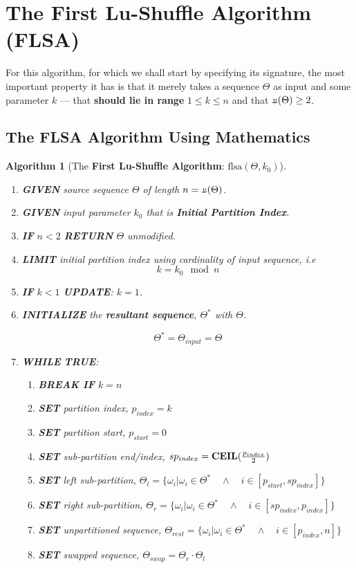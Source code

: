 \documentclass[a4paper, 18pt]{book} %
\newtheorem{alg}{Algorithm}
\newcommand{\invpi}{\rotatebox[origin=c]{180}{$\pi$}}
\begin{document}
\section{The First Lu-Shuffle Algorithm (FLSA)}

For this algorithm, for which we shall start by specifying its signature, the most important property it has is that it merely takes a sequence $\Theta$ as input and some parameter $k$ --- that \textbf{should lie in range} $1 \leq k \leq n$ and that $\invpi(\Theta) \geq 2$.

\subsection{The FLSA Algorithm Using Mathematics}

\begin{alg}[The \textbf{First Lu-Shuffle Algorithm}: $\text{flsa}(\Theta, k_0)$]
\label{ALGLUSHUFFLEA}
$ $\\
\begin{enumerate}
\item \textbf{GIVEN} source sequence $\Theta$ of length $n = \invpi(\Theta)$.
\item  \textbf{GIVEN} input parameter $k_0$ that is \textbf{Initial Partition Index}.
\item \textbf{IF} $n < 2$ \textbf{RETURN} $\Theta$ unmodified.
\item {\textbf{LIMIT} initial partition index using cardinality of input sequence, i.e
\begin{equation}
k = k_0 \mod n
\end{equation}
}
\item \textbf{IF} $k < 1$ \textbf{UPDATE}: $k = 1$.
\item{  \textbf{INITIALIZE} the \textbf{resultant sequence}, $\Theta^*$ with $\Theta$.

		\begin{equation}
		\Theta^* = \Theta_{input} = \Theta
		\end{equation}
}
\item { \textbf{WHILE} \textbf{TRUE}:
\begin{enumerate}
	\item \textbf{BREAK IF} $k = n$
	\item \textbf{SET} partition index, $p_{index} = k$
	\item \textbf{SET} partition start, $p_{start} = 0$
	\item \textbf{SET} sub-partition end/index, $sp_{index} = \text{\textbf{CEIL}}(\frac{p_{index}}{2})$
	\item \textbf{SET} left sub-partition, $\Theta_{l} = \{\omega_i | \omega_i \in \Theta^* \quad \land \quad i \in [p_{start},sp_{index}]\}$
	\item \textbf{SET} right sub-partition, $\Theta_{r} = \{\omega_i | \omega_i \in \Theta^* \quad \land \quad i \in [sp_{index},p_{index}]\}$
	\item \textbf{SET} unpartitioned sequence, $\Theta_{rest} = \{\omega_i | \omega_i \in \Theta^* \quad \land \quad i \in [p_{index},n]\}$
	\item \textbf{SET} swapped sequence, $\Theta_{swap} = \Theta_{r} \cdot \Theta_{l}$ 
	

\end{enumerate}}
\end{enumerate}
\end{alg}
\end{document}
